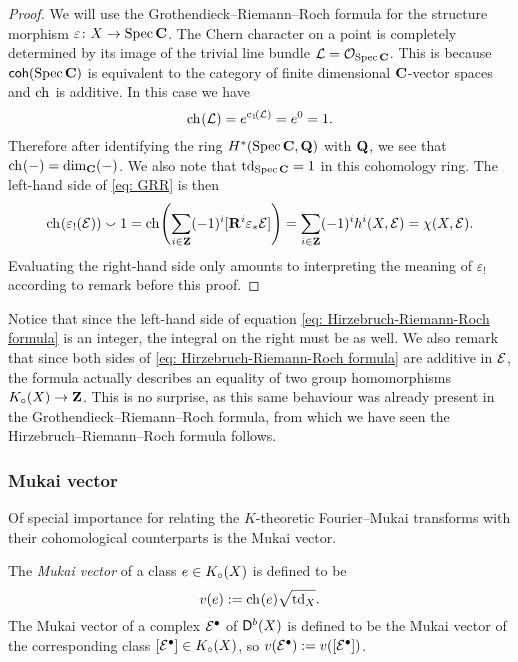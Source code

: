 \begin{proof}
    We will use the Grothendieck--Riemann--Roch formula for the structure morphism $\varepsilon \colon X \to \operatorname{Spec}\mathbf C$. The Chern character on a point is completely determined by its image of the trivial line bundle $\mathcal L = {\mathcal{O}_{\operatorname{Spec}\mathbf C}}$. This is because $\mathsf{coh}(\operatorname{Spec}\mathbf C)$ is equivalent to the category of finite dimensional $\mathbf C$-vector spaces and $\ch[]$ is additive. In this case we have
    \[
        \ch[]{\mathcal L} = e^{\cclass[1]{\mathcal L}} = e^0 = 1.
    \]
    Therefore after identifying the ring $H^{*}(\operatorname{Spec}\mathbf C, \mathbf Q)$ with $\mathbf Q$, we see that $\ch[](-) = \dim_\C(-)$. We also note that $\operatorname{td}_{\operatorname{Spec}\mathbf C} = 1$ in this cohomology ring. The left-hand side of \eqref{eq: GRR} is then
    \[
        \ch[]{\varepsilon_!(\E)}\smallsmile 1 = \ch[]{\sum_{i \in \Z}(-1)^i[\rderived{i}{\varepsilon_*}\E]} = \sum_{i\in \Z}(-1)^i h^i({X},{\E}) = \chi(X, \E).
    \]  
    Evaluating the right-hand side only amounts to interpreting the meaning of $\varepsilon_!$ according to remark before this proof.
\end{proof}

\begin{remark}
    \label{HRR is an equality of homomorphisms}
    Notice that since the left-hand side of equation \eqref{eq: Hirzebruch-Riemann-Roch formula} is an integer, the integral on the right must be as well. 
    We also remark that since both sides of \eqref{eq: Hirzebruch-Riemann-Roch formula} are additive in $\mathcal E$, the formula actually describes an equality of two group homomorphisms $K_{\circ}(X) \to \mathbf Z$. This is no surprise, as this same behaviour was already present in the Grothendieck--Riemann--Roch formula, from which we have seen the Hirzebruch--Riemann--Roch formula follows.
\end{remark}

\subsubsection*{Mukai vector}

Of special importance for relating the $K$-theoretic Fourier--Mukai transforms with their cohomological counterparts is the Mukai vector. 

\begin{definition}
    The \emph{Mukai vector} of a class $e \in K_{\circ}(X)$ is defined to be
    \[
        v(e) := \ch[](e)\sqrt{\tdclass{X}}.
    \]
    The Mukai vector of a complex $\mathcal E^\bullet$ of $\mathsf{D}^b(X)$ is defined to be the Mukai vector of the corresponding class $[\mathcal E^\bullet] \in K_{\circ}(X)$, so $v(\mathcal E^\bullet) := v([\mathcal E^\bullet])$.
\end{definition}

